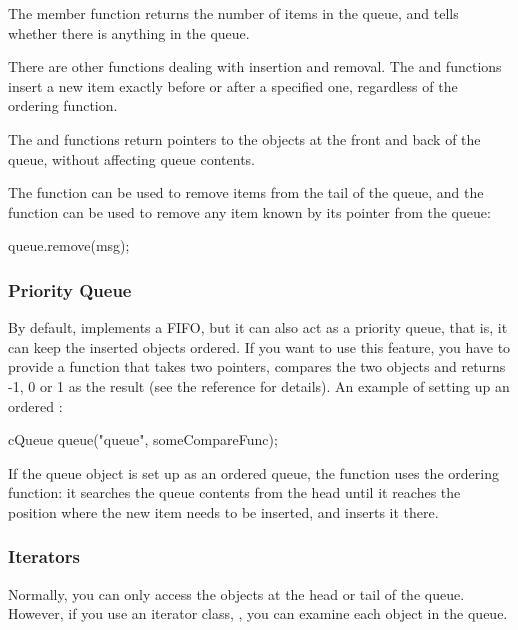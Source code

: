 The  member function returns the number of items in the
queue, and  tells whether there is anything in the queue.

There are other functions dealing with insertion and removal.  The
 and  functions insert a
new item exactly before or after a specified one, regardless of the
ordering function.

The  and  functions return pointers to the objects
at the front and back of the queue, without affecting queue contents.

The  function can be used to remove items from the
tail of the queue, and the  function can be
used to remove any item known by its pointer from the queue:

\begin{cpp}
queue.remove(msg);
\end{cpp}



\subsubsection{Priority Queue}


By default,  implements a FIFO, but it can also act as
a priority queue, that is, it can keep the inserted objects
ordered.  If you want to use this feature, you have
to provide a function that takes two  pointers,
compares the two objects and returns -1, 0 or 1 as the result (see the
reference for details).  An example of setting up an ordered
:

\begin{cpp}
cQueue queue("queue", someCompareFunc);
\end{cpp}


If the queue object is set up as an ordered queue, the 
function uses the ordering function: it searches the queue contents
from the head until it reaches the position where the new item
needs to be inserted, and inserts it there.


\subsubsection{Iterators}


Normally, you can only access the objects at the head or tail of the
queue. However, if you use an iterator class, ,
you can examine each object in the queue.

